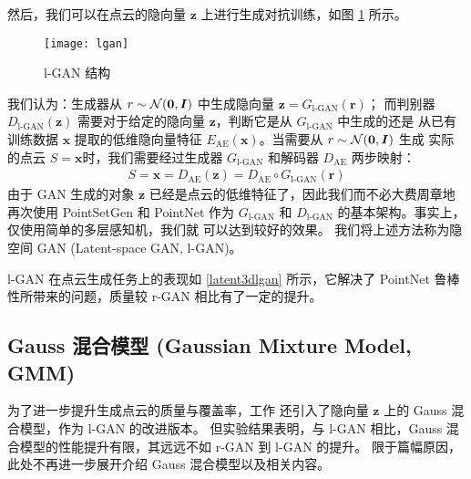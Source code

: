 然后，我们可以在点云的隐向量 $\bm z$ 上进行生成对抗训练，如图 \ref{fig:lgan} 所示。
\begin{figure}[h]
	\centering%
	{\texttt{[image: lgan]}}%

	\caption{l-GAN 结构 \cite{latentpc}\label{fig:lgan}}
\end{figure}
我们认为：生成器从 $r \sim \mathcal{N}(\bm 0, \bm I)$ 中生成隐向量 $\bm z = G_{\text{l-GAN}}(\bm r)$；
而判别器 $D_{\text{l-GAN}}(\bm z)$ 需要对于给定的隐向量 $\bm z$，判断它是从 $G_{\text{l-GAN}}$ 中生成的还是
从已有训练数据 $\bm x$ 提取的低维隐向量特征 $E_{\text{AE}}(\bm x)$。当需要从 $r \sim \mathcal{N}(\bm 0, \bm I)$ 生成
实际的点云 $S = \bm x$时，我们需要经过生成器 $G_{\text{l-GAN}}$ 和解码器 $D_{\text{AE}}$ 两步映射：
\begin{align}
	S = \bm x = D_{\text{AE}}(\bm z) = D_{\text{AE}} \circ G_{\text{l-GAN}} (\bm r)
\end{align}
由于 GAN 生成的对象 $\bm z$ 已经是点云的低维特征了，因此我们而不必大费周章地再次使用 PointSetGen 和 PointNet 作为 $G_{\text{l-GAN}}$ 和 $D_{\text{l-GAN}}$ 的基本架构。事实上，仅使用简单的多层感知机，我们就%
可以达到较好的效果。
我们将上述方法称为隐空间 GAN (Latent-space GAN, l-GAN)。

l-GAN 在点云生成任务上的表现如 \ref{latent3dlgan} 所示，它解决了 PointNet 鲁棒性所带来的问题，质量较 r-GAN 相比有了一定的提升。


\subsection{Gauss 混合模型 (Gaussian Mixture Model, GMM)}
为了进一步提升生成点云的质量与覆盖率，工作  还引入了隐向量 $\bm z$ 上的 Gauss 混合模型，作为 l-GAN 的改进版本。
但实验结果表明，与 l-GAN 相比，Gauss 混合模型的性能提升有限，其远远不如 r-GAN 到 l-GAN 的提升。%
限于篇幅原因，此处不再进一步展开介绍 Gauss 混合模型以及相关内容。%








